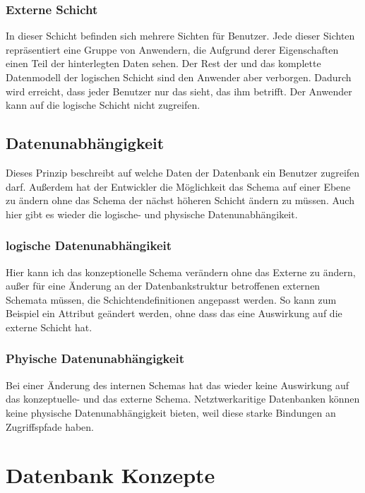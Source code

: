 \begin{flushleft}
\subsubsection{Externe Schicht}

In dieser Schicht befinden sich mehrere Sichten für Benutzer. Jede dieser Sichten repräsentiert eine Gruppe von Anwendern, die Aufgrund derer Eigenschaften einen Teil der hinterlegten Daten sehen. 
Der Rest der und das komplette Datenmodell der logischen Schicht sind den Anwender aber verborgen. Dadurch wird erreicht, dass jeder Benutzer nur das sieht, das ihm betrifft. Der Anwender kann auf die logische Schicht nicht zugreifen.

\subsection {Datenunabhängigkeit}

Dieses Prinzip beschreibt auf welche Daten der Datenbank ein Benutzer zugreifen darf. Außerdem hat der Entwickler die Möglichkeit das Schema auf einer Ebene zu ändern ohne das Schema der nächst höheren Schicht ändern zu müssen. Auch hier gibt es wieder die logische- und physische Datenunabhängikeit.

\subsubsection{logische Datenunabhängikeit}

Hier kann ich das konzeptionelle Schema verändern ohne das Externe zu ändern, außer für eine Änderung an der Datenbankstruktur betroffenen externen Schemata müssen, die Schichtendefinitionen angepasst werden. So kann zum Beispiel ein Attribut geändert werden, ohne dass das eine Auswirkung auf die externe Schicht hat.

\subsubsection{Phyische Datenunabhängigkeit}

Bei einer Änderung des internen Schemas hat das wieder keine Auswirkung auf das konzeptuelle- und das externe Schema. Netztwerkaritige Datenbanken können keine physische Datenunabhängigkeit bieten, weil diese starke Bindungen an Zugriffspfade haben.

\section{Datenbank Konzepte}


\end{flushleft}
